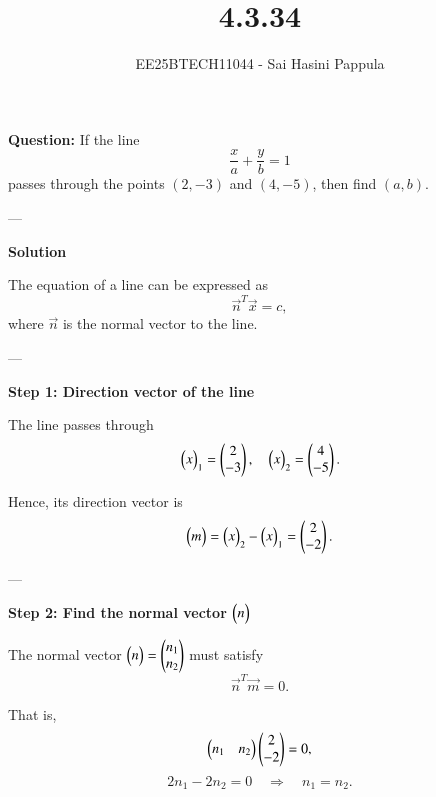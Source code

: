 \documentclass[journal]{IEEEtran}
\begin{document}

\vspace{3cm}

\title{4.3.34}
\author{EE25BTECH11044 - Sai Hasini Pappula}
 \maketitle
{\let\newpage\relax\maketitle}

\renewcommand{\thefigure}{\theenumi}
\renewcommand{\thetable}{\theenumi}
\setlength{\intextsep}{10pt} 

\renewcommand{\thetable}{\theenumi}

\textbf{Question:}  
If the line 
\[
\frac{x}{a} + \frac{y}{b} = 1
\]
passes through the points $(2,-3)$ and $(4,-5)$, then find $(a,b)$. 

---

\textbf{Solution}

The equation of a line can be expressed as
\begin{equation}
\vec{n}^T \vec{x} = c,
\end{equation}
where $\vec{n}$ is the normal vector to the line.

---

\textbf{Step 1: Direction vector of the line}

The line passes through
\begin{equation}
\begin{pmatrix}x\end{pmatrix}_1 = \begin{pmatrix}2\\-3\end{pmatrix}, \quad
\begin{pmatrix}x\end{pmatrix}_2 = \begin{pmatrix}4\\-5\end{pmatrix}.
\end{equation}

Hence, its direction vector is
\begin{equation}
\begin{pmatrix}m\end{pmatrix} = \begin{pmatrix}x\end{pmatrix}_2 - \begin{pmatrix}x\end{pmatrix}_1
= \begin{pmatrix}2 \\ -2\end{pmatrix}.
\end{equation}

---

\textbf{Step 2: Find the normal vector $\begin{pmatrix}n\end{pmatrix}$}

The normal vector $\begin{pmatrix}n\end{pmatrix} = \begin{pmatrix}n_1 \\ n_2\end{pmatrix}$ must satisfy
\begin{equation}
\vec{n}^T \vec{m} = 0.
\end{equation}

That is,
\begin{equation}
\begin{pmatrix}n_1 & n_2\end{pmatrix}\begin{pmatrix}2 \\ -2\end{pmatrix} = 0,
\end{equation}
\begin{equation}
2n_1 - 2n_2 = 0 \quad \Rightarrow \quad n_1 = n_2.
\end{equation}
\end{document}
